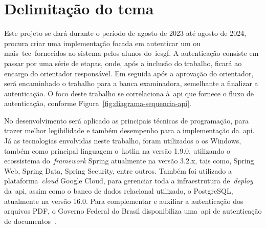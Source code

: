 \section{Delimitação do tema}\label{sec:delimitacao-do-tema}

Este projeto se dará durante o período de agosto de 2023 até agosto
de 2024, procura criar uma implementação focada em autenticar um ou
mais~\acrfull{tcc}~fornecidos ao sistema pelos alunos do~\acrfull{iesgf}.
A autenticação consiste em passar por uma série de etapas,
onde, após a inclusão do trabalho, ficará ao encargo do orientador
responsável.
Em seguida após a aprovação do orientador, será encaminhado o trabalho
para a banca examinadora, semelhante a finalizar a autenticação.
O foco deste trabalho se correlaciona à~\acrshort{api} que fornece o
fluxo de autenticação, conforme Figura~\ref{fig:diagrama-sequencia-api}.

No desenvolvimento será aplicado as principais técnicas de
programação, para trazer melhor legibilidade e também desempenho
para a implementação da~\acrshort{api}.
Já as tecnologias envolvidas neste trabalho, foram utilizados o \acrfull{os}
Windows, também como principal linguagem o~\acrfull{kotlin} na
versão 1.9.0, utilizando o ecossistema do~\textit{framework} Spring
atualmente na versão 3.2.x, tais como, Spring Web, Spring Data,
Spring Security, entre outros.
Também foi utilizado a plataforma~\textit{cloud} Google Cloud, para
gerenciar toda a infraestrutura de~\textit{deploy} da~\acrshort{api},
assim como o banco de dados relacional utilizado, o PostgreSQL,
atualmente na versão 16.0.
Para complementar e auxiliar a autenticação dos arquivos PDF, o
Governo Federal do Brasil disponibiliza uma~\acrshort{api} de
autenticação de documentos~.

